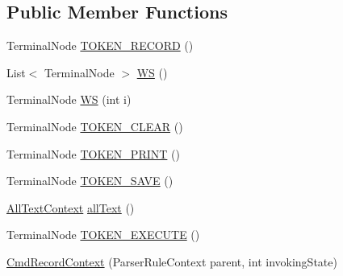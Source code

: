 \subsection*{Public Member Functions}
\begin{DoxyCompactItemize}
\item 
Terminal\+Node \hyperlink{classgov_1_1nasa_1_1jpf_1_1inspector_1_1client_1_1parser_1_1_console_grammar_parser_1_1_cmd_record_context_aa7062e6776bdb05da05f2f64541a40ef}{T\+O\+K\+E\+N\+\_\+\+R\+E\+C\+O\+RD} ()
\item 
List$<$ Terminal\+Node $>$ \hyperlink{classgov_1_1nasa_1_1jpf_1_1inspector_1_1client_1_1parser_1_1_console_grammar_parser_1_1_cmd_record_context_acebd9a95437c8ba7a7188c8d7e2fa5dc}{WS} ()
\item 
Terminal\+Node \hyperlink{classgov_1_1nasa_1_1jpf_1_1inspector_1_1client_1_1parser_1_1_console_grammar_parser_1_1_cmd_record_context_a1123f6bfd9096c60c485da52142ea742}{WS} (int i)
\item 
Terminal\+Node \hyperlink{classgov_1_1nasa_1_1jpf_1_1inspector_1_1client_1_1parser_1_1_console_grammar_parser_1_1_cmd_record_context_a74d51e4bc2ce16c141aac39dfb81b1aa}{T\+O\+K\+E\+N\+\_\+\+C\+L\+E\+AR} ()
\item 
Terminal\+Node \hyperlink{classgov_1_1nasa_1_1jpf_1_1inspector_1_1client_1_1parser_1_1_console_grammar_parser_1_1_cmd_record_context_a5711184c2c2696329ff6640abab5d93a}{T\+O\+K\+E\+N\+\_\+\+P\+R\+I\+NT} ()
\item 
Terminal\+Node \hyperlink{classgov_1_1nasa_1_1jpf_1_1inspector_1_1client_1_1parser_1_1_console_grammar_parser_1_1_cmd_record_context_ae782abdae5db0430dfaf72caf505708f}{T\+O\+K\+E\+N\+\_\+\+S\+A\+VE} ()
\item 
\hyperlink{classgov_1_1nasa_1_1jpf_1_1inspector_1_1client_1_1parser_1_1_console_grammar_parser_1_1_all_text_context}{All\+Text\+Context} \hyperlink{classgov_1_1nasa_1_1jpf_1_1inspector_1_1client_1_1parser_1_1_console_grammar_parser_1_1_cmd_record_context_a9eb4c9a041cb79cf0fe91a25228f914c}{all\+Text} ()
\item 
Terminal\+Node \hyperlink{classgov_1_1nasa_1_1jpf_1_1inspector_1_1client_1_1parser_1_1_console_grammar_parser_1_1_cmd_record_context_aa3bbd1db84eff5d80c8aad077add43c2}{T\+O\+K\+E\+N\+\_\+\+E\+X\+E\+C\+U\+TE} ()
\item 
\hyperlink{classgov_1_1nasa_1_1jpf_1_1inspector_1_1client_1_1parser_1_1_console_grammar_parser_1_1_cmd_record_context_a714752c2aa02bf80eb1545b3939165fe}{Cmd\+Record\+Context} (Parser\+Rule\+Context parent, int invoking\+State)

\end{DoxyCompactItemize}
